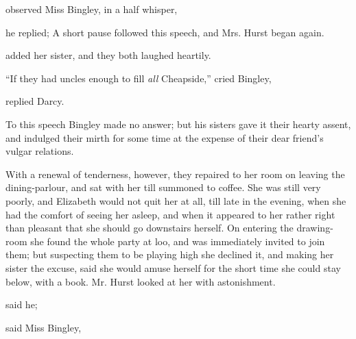  observed Miss Bingley, in a half whisper, 

 he replied;  A short pause followed this speech, and Mrs. Hurst began again.




 added her sister, and they both laughed heartily.

“If they had uncles enough to fill {\em all} Cheapside,” cried Bingley, 

 replied Darcy.

To this speech Bingley made no answer; but his sisters gave it their hearty assent, and indulged their mirth for some time at the expense of their dear friend's vulgar relations.

With a renewal of tenderness, however, they repaired to her room on leaving the dining-parlour, and sat with her till summoned to coffee. She was still very poorly, and Elizabeth would not quit her at all, till late in the evening, when she had the comfort of seeing her asleep, and when it appeared to her rather right than pleasant that she should go downstairs herself. On entering the drawing-room she found the whole party at loo, and was immediately invited to join them; but suspecting them to be playing high she declined it, and making her sister the excuse, said she would amuse herself for the short time she could stay below, with a book. Mr. Hurst looked at her with astonishment.

 said he; 

 said Miss Bingley, 

